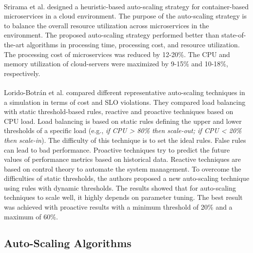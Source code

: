 \paragraph{}
Srirama et al. \cite{Srirama2020AppDeplyCont} designed a heuristic-based auto-scaling strategy for container-based microservices in a cloud environment. The purpose of the auto-scaling strategy is to balance the overall resource utilization across microservices in the environment.
The proposed auto-scaling strategy performed better than state-of-the-art algorithms in processing time, processing cost, and resource utilization. The processing cost of microservices was reduced by 12-20\%. The CPU and memory utilization of cloud-servers were maximized by 9-15\% and 10-18\%, respectively.


\paragraph{}
Lorido-Botrán et al.  \cite{Botran2013AutoScalingComp} compared different representative auto-scaling techniques in a simulation in terms of cost and SLO violations. They compared load balancing with static threshold-based rules, reactive and proactive techniques based on CPU load.
Load balancing is based on static rules defining the upper and lower thresholds of a specific load (e.g., \textit{if CPU > 80\% then scale-out; if CPU < 20\% then scale-in}). The difficulty of this technique is to set the ideal rules. False rules can lead to bad performance. Proactive techniques try to predict the future values of performance metrics based on historical data. Reactive techniques are based on control theory to automate the system management. To overcome the difficulties of static thresholds, the authors proposed a new auto-scaling technique using rules with dynamic thresholds. The results showed that for auto-scaling techniques to scale well, it highly depends on parameter tuning. The best result was achieved with proactive results with a minimum threshold of 20\% and a maximum of 60\%.


\subsection{Auto-Scaling Algorithms}
